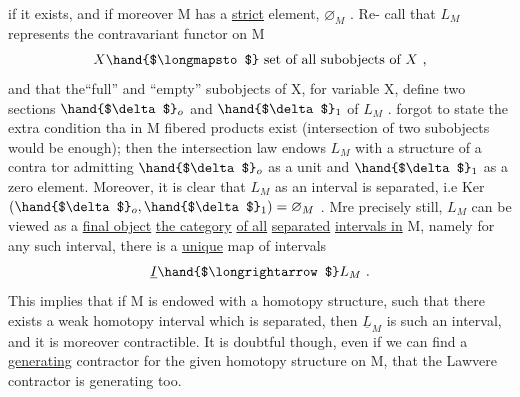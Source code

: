 if it exists,  and if moreover M has a \uline{strict}  element, $\varnothing_{M}$ .  Re-%
call that $L_{M}$  represents the contravariant functor on M
\[ X \hand{$\longmapsto$} \text{ set of all subobjects of } X \text{ ,} \]
and that the``full'' and ``empty'' subobjects of X,  for variable X,  define
two sections $\hand{$\delta$}_{o}$ and $\hand{$\delta$}_{1}$ of $L_{M}$ .   forgot to state the extra condition tha
in M fibered products exist (intersection of two subobjects would be
enough);  then the intersection law endows $L_{M}$ with a structure of a contra
tor \deleted{,} admitting $\hand{$\delta$}_{o}$ as a unit and $\hand{$\delta$}_{1}$ as a zero element.  Moreover,  it is
clear that $L_{M}$ as an interval is separated,  i.e\hand{,} Ker$(\hand{$\delta$}_{o},\hand{$\delta$}_{1}) = \varnothing_{M}$ .  Mre
precisely still,  $L_{M}$ can be viewed as a \uline{final object}  \uline{the  category}
\uline{of all} \uline{separated} \uline{intervals in} M,  namely for any such interval,  there is
a \uline{unique} map of intervals
\[ \underline{I} \hand{$\longrightarrow$} L_{M} \text{ .} \]
This implies that if M is endowed with a homotopy structure,  such that
there exists a weak homotopy interval which is separated,  then $\underline{L}_{M}$ is such
an interval,  and it is moreover contractible.  It is doubtful though,
even if we can find a  \uline{generating} contractor for the given homotopy
structure on M,  that the Lawvere contractor is generating too.

